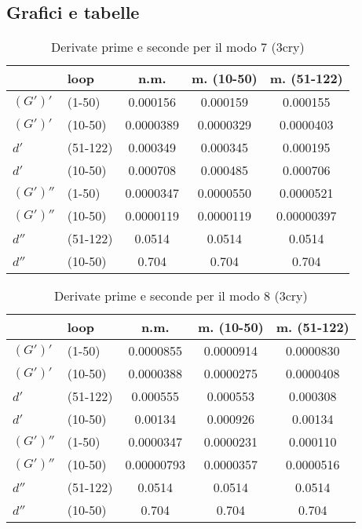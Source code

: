 \begin{appendices}
\chapter{Grafici e tabelle}
\begin{table}[H]
	\caption{Derivate prime e seconde per il modo 7 (3cry)}
	\vspace{-0.5cm}
	\label{tb:modo_7}
	\begin{center}
		\begin{tabular}{llccc}
			\toprule
			& loop & n.m.  & m. (10-50) & m. (51-122)  \\			
			\midrule
			$(G')' $ & (1-50)  & 0.000156 & 0.000159 & 0.000155 \\
			$(G')' $ & (10-50) & 0.0000389 & 0.0000329 & 0.0000403 \\
			$ d' $ & (51-122) & 0.000349 & 0.000345 & 0.000195 \\
			$ d' $ & (10-50)  & 0.000708 & 0.000485 & 0.000706 \\
			$(G')'' $ & (1-50) & 0.0000347 & 0.0000550 & 0.0000521 \\
			$(G')'' $ & (10-50) & 0.0000119 & 0.0000119 & 0.00000397 \\
			$ d'' $ & (51-122) & 0.0514 & 0.0514 & 0.0514 \\
			$ d'' $ & (10-50) & 0.704 & 0.704 & 0.704 \\
			\bottomrule
		\end{tabular}
	\end{center}
\end{table}

\vspace{-0.5cm}

\begin{table}[H]
	\caption{Derivate prime e seconde per il modo 8 (3cry)}
	\vspace{-0.5cm}
	\label{tb:modo_8}
	\begin{center}
		\begin{tabular}{llccc}
			\toprule
			& loop & n.m.  & m. (10-50) & m. (51-122)  \\			
			\midrule
			$(G')' $ & (1-50) & 0.0000855 & 0.0000914 & 0.0000830 \\
			$(G')' $ & (10-50) & 0.0000388 & 0.0000275 & 0.0000408 \\
			$ d' $ & (51-122) & 0.000555 & 0.000553 & 0.000308 \\
			$ d' $ & (10-50) & 0.00134 & 0.000926 & 0.00134 \\
			$(G')'' $ & (1-50) & 0.0000347 & 0.0000231 & 0.000110 \\
			$(G')'' $ & (10-50)  & 0.00000793 & 0.0000357 & 0.0000516 \\
			$ d'' $ & (51-122) & 0.0514 & 0.0514 & 0.0514 \\
			$ d'' $ & (10-50) & 0.704 & 0.704 & 0.704 \\
			\bottomrule
		\end{tabular}
	\end{center}
\end{table}


\end{appendices}
